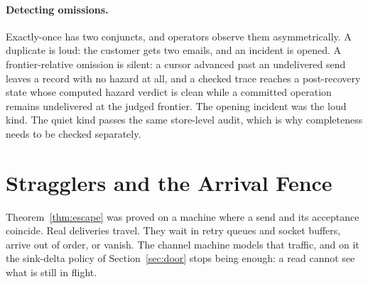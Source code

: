 \documentclass[sigplan,10pt]{acmart}
\theoremstyle{plain}
\theoremstyle{definition}
\begin{document}
\paragraph{Detecting omissions.}
Exactly-once has two conjuncts, and operators observe them asymmetrically.
A duplicate is loud: the customer gets two emails, and an incident is
opened. A frontier-relative omission is silent: a cursor advanced
past an undelivered send leaves a record with no hazard at all, and a
checked trace reaches a post-recovery state whose computed
hazard verdict is clean while a committed operation remains undelivered at the
judged frontier. The opening incident was the loud kind. The quiet
kind passes the same store-level audit, which is why
completeness needs to be checked separately.

\section{Stragglers and the Arrival Fence}\label{sec:wire}

Theorem~\ref{thm:escape} was proved on a machine where a send and its
acceptance coincide. Real deliveries travel. They wait in retry queues
and socket buffers, arrive out of order, or vanish. The channel machine
models that traffic, and on it the sink-delta policy of Section~\ref{sec:door}
stops being enough: a read cannot see what is still in flight.
\end{document}
